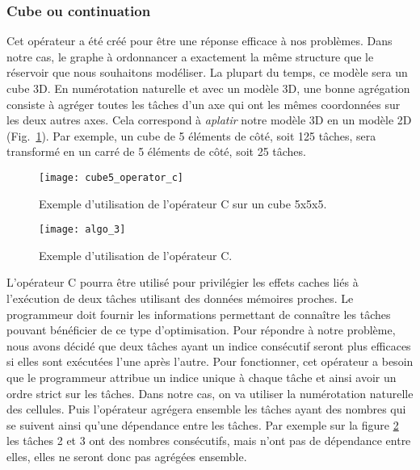 \subsubsection{Cube ou continuation}
Cet opérateur a été créé pour être une réponse efficace à nos problèmes.
%
Dans notre cas, le graphe à ordonnancer a exactement la même structure que le réservoir que nous souhaitons modéliser.
%
La plupart du temps, ce modèle sera un cube 3D.
%
En numérotation naturelle et avec un modèle 3D, une bonne agrégation consiste à agréger toutes les tâches d'un axe qui ont les mêmes coordonnées sur les deux autres axes.
%
Cela correspond à {\em aplatir} notre modèle 3D en un modèle 2D (Fig.~\ref{fig:cube5_algo_C}).
%
Par exemple, un cube de 5 éléments de côté, soit 125 tâches, sera transformé en un carré de 5 éléments de côté, soit 25 tâches.

\begin{figure}
  \centering
  \texttt{[image: cube5\_operator\_c]}
  \caption{Exemple d'utilisation de l'opérateur C sur un cube 5x5x5.}
  \label{fig:cube5_algo_C}
\end{figure}

\begin{figure}
  \centering
  \texttt{[image: algo\_3]}
  \caption{Exemple d'utilisation de l'opérateur C.}
  \label{fig:algo_C}
\end{figure}

L'opérateur C pourra être utilisé pour privilégier les effets caches liés à l'exécution de deux tâches utilisant des données mémoires proches.
%
Le programmeur doit fournir les informations permettant de connaître les tâches pouvant bénéficier de ce type d'optimisation.
%
Pour répondre à notre problème, nous avons décidé que deux tâches ayant un indice consécutif seront plus efficaces si elles sont exécutées l'une après l'autre.
%
Pour fonctionner, cet opérateur a besoin que le programmeur attribue un indice unique à chaque tâche et ainsi avoir un ordre strict sur les tâches.
%
Dans notre cas, on va utiliser la numérotation naturelle des cellules.
%
Puis l'opérateur agrégera ensemble les tâches ayant des nombres qui se suivent ainsi qu'une dépendance entre les tâches.
%
Par exemple sur la figure \ref{fig:algo_C} les tâches 2 et 3 ont des nombres consécutifs, mais n'ont pas de dépendance entre elles, elles ne seront donc pas agrégées ensemble.

